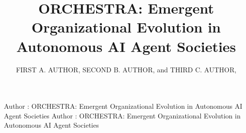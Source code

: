 \documentclass{ieeeaccess}
\begin{document}

\title{ORCHESTRA: Emergent Organizational Evolution in Autonomous AI Agent Societies}

\author{\uppercase{First A. Author},
\uppercase{Second B. Author}, and
\uppercase{Third C. Author}, }

\address[1]{Department of Computer Science and Engineering, Premier Research Institute, City, State, Postal Code, Country (e-mail: first.author@institute.edu)}
\address[2]{Department of Artificial Intelligence and Data Science, Technological University, City, State, Postal Code, Country (e-mail: second.author@techuniv.edu)}
\address[3]{National Center for Advanced Autonomous Systems, National Research Center, City, State, Postal Code, Country (e-mail: third.author@research.gov)}


\markboth
{Author \headeretal: ORCHESTRA: Emergent Organizational Evolution in Autonomous AI Agent Societies}
{Author \headeretal: ORCHESTRA: Emergent Organizational Evolution in Autonomous AI Agent Societies}

\end{document}
